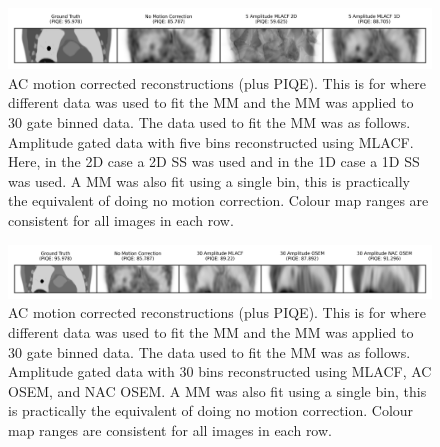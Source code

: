             \begin{figure}
                \centering
                
                \includegraphics[width=1.0\linewidth]{figures/motion_correction_2_results_2_1d_vs_2d_visual_analysis.png}
                
                \captionsetup{singlelinecheck=false}
                \caption{
                    \gls{AC} motion corrected reconstructions (plus \gls{PIQE}). This is for where different data was used to fit the \gls{MM} and the \gls{MM} was applied to $30$ gate binned data. The data used to fit the \gls{MM} was as follows. Amplitude gated data with five bins reconstructed using \gls{MLACF}. Here, in the \gls{2D} case a \gls{2D} \gls{SS} was used and in the \gls{1D} case a \gls{1D} \gls{SS} was used. A \gls{MM} was also fit using a single bin, this is practically the equivalent of doing no motion correction. Colour map ranges are consistent for all images in each row.
                }
                
                \label{fig:evaluation_of_pet_ct_motion_correction_incorporating_motion_models_using_mlacf_and_complex_gating_schemes_results_1d_vs_2d_visual_analysis}
            \end{figure}

            \begin{figure}
                \centering
                
                \includegraphics[width=1.0\linewidth]{figures/motion_correction_2_results_2_30_amplitude_visual_analysis.png}
                
                \captionsetup{singlelinecheck=false}
                \caption{
                    \gls{AC} motion corrected reconstructions (plus \gls{PIQE}). This is for where different data was used to fit the \gls{MM} and the \gls{MM} was applied to $30$ gate binned data. The data used to fit the \gls{MM} was as follows. Amplitude gated data with $30$ bins reconstructed using \gls{MLACF}, \gls{AC} \gls{OSEM}, and \gls{NAC} \gls{OSEM}. A \gls{MM} was also fit using a single bin, this is practically the equivalent of doing no motion correction. Colour map ranges are consistent for all images in each row.
                }
                
                \label{fig:evaluation_of_pet_ct_motion_correction_incorporating_motion_models_using_mlacf_and_complex_gating_schemes_results_30_amplitude_visual_analysis}
            \end{figure}

